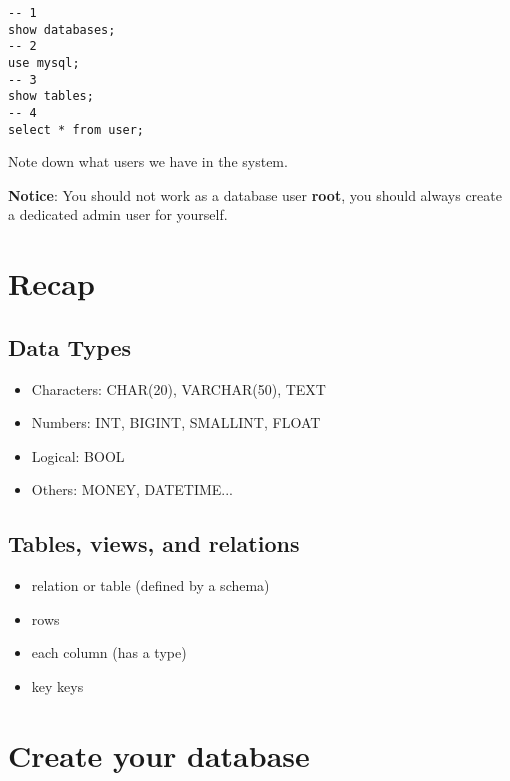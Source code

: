\documentclass[12pt, letterpaper]{article}
\begin{document}
\begin{verbatim}
-- 1
show databases;
-- 2
use mysql;
-- 3
show tables;
-- 4
select * from user;
\end{verbatim}


Note down what users we have in the system.
\bigskip
\bigskip
\bigskip

\textbf{Notice}: You should not work as a database user \textbf{root}, you should always create a dedicated admin user for yourself.

\section{Recap}

\subsection{Data Types}

\begin{itemize}
\item Characters: CHAR(20), VARCHAR(50), TEXT
\item Numbers: INT, BIGINT, SMALLINT, FLOAT
\item Logical: BOOL
\item Others: MONEY, DATETIME...
\end{itemize}

\subsection{Tables, views, and relations}

\begin{itemize}
\item relation or table (defined by a schema)
\item rows
\item each column (has a type)
\item key keys
\end{itemize}

\section{Create your database}
\end{document}
